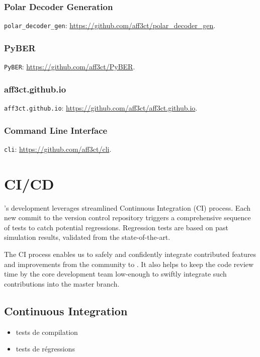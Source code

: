 \subsubsection{Polar Decoder Generation}

\verb|polar_decoder_gen|: \url{https://github.com/aff3ct/polar_decoder_gen}.

\subsubsection{PyBER}

\verb|PyBER|: \url{https://github.com/aff3ct/PyBER}.

\subsubsection{aff3ct.github.io}

\verb|aff3ct.github.io|: \url{https://github.com/aff3ct/aff3ct.github.io}.

\subsubsection{Command Line Interface}

\verb|cli|: \url{https://github.com/aff3ct/cli}.

\section{CI/CD}

\AFFECT's development leverages streamlined Continuous Integration (CI) process.
Each new commit to the version control repository triggers a comprehensive
sequence of tests to catch potential regressions. Regression tests are based on
past simulation results, validated from the state-of-the-art.

The CI process enables us to safely and confidently integrate contributed
features and improvements from the community to \AFFECT. It also helps to keep
the code review time by the core development team low-enough to swiftly
integrate such contributions into the master branch.

\subsection{Continuous Integration}
\begin{itemize}
  \item tests de compilation
  \item tests de régressions
\end{itemize}

